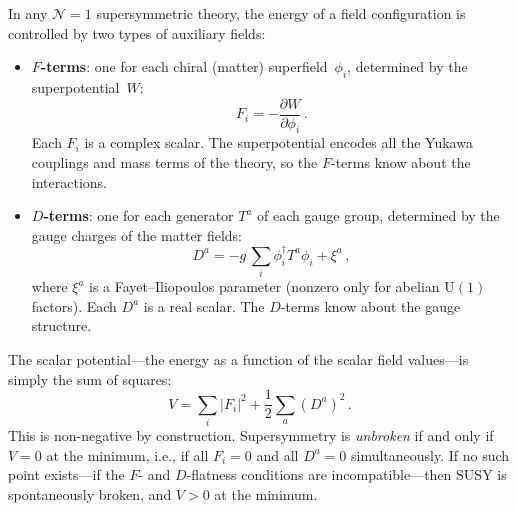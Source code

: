\documentclass[12pt,a4paper]{article}
\makeatletter
\newcommand{\UU}{\mathrm{U}}
\newcommand{\ie}{i.e.\@}
\makeatother
\begin{document}
In any $\mathcal{N}=1$ supersymmetric theory, the energy of
a field configuration is controlled by two types of auxiliary
fields:
\begin{itemize}
  \item \textbf{$F$-terms}: one for each chiral (matter)
    superfield~$\phi_i$, determined by the superpotential~$W$:
    \begin{equation}
      F_i = -\frac{\partial W}{\partial\phi_i}\,.
      \label{eq:Fterm_def}
    \end{equation}
    Each $F_i$ is a complex scalar.  The superpotential encodes
    all the Yukawa couplings and mass terms of the theory, so the
    $F$-terms know about the interactions.
  \item \textbf{$D$-terms}: one for each generator $T^a$ of
    each gauge group, determined by the gauge charges of the
    matter fields:
    \begin{equation}
      D^a = -g\,\sum_i \phi_i^\dagger T^a \phi_i + \xi^a\,,
      \label{eq:Dterm_def}
    \end{equation}
    where $\xi^a$ is a Fayet--Iliopoulos parameter (nonzero only
    for abelian $\UU(1)$ factors). Each $D^a$ is a real scalar.
    The $D$-terms know about the gauge structure.
\end{itemize}
The scalar potential---the energy as a function of the scalar
field values---is simply the sum of squares:
\begin{equation}
  V = \sum_i |F_i|^2 + \frac{1}{2}\sum_a (D^a)^2\,.
  \label{eq:Vscalar}
\end{equation}
This is non-negative by construction. Supersymmetry is
\emph{unbroken} if and only if $V = 0$ at the minimum, \ie,
if all $F_i = 0$ and all $D^a = 0$ simultaneously.
If no such point exists---if the $F$- and $D$-flatness conditions
are incompatible---then SUSY is spontaneously broken,
and $V > 0$ at the minimum.
\end{document}
